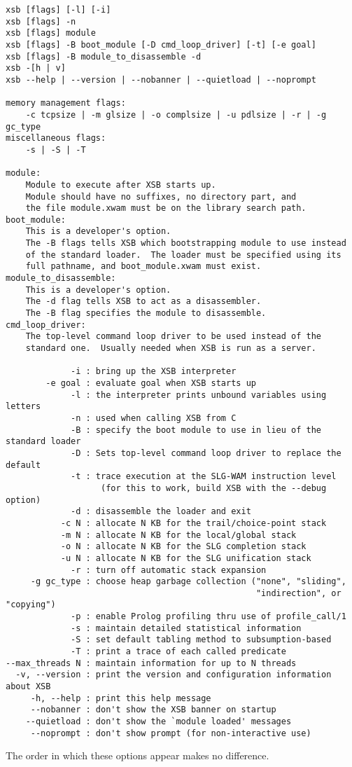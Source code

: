 {\small 
\begin{verbatim}
xsb [flags] [-l] [-i]
xsb [flags] -n
xsb [flags] module
xsb [flags] -B boot_module [-D cmd_loop_driver] [-t] [-e goal]
xsb [flags] -B module_to_disassemble -d
xsb -[h | v]
xsb --help | --version | --nobanner | --quietload | --noprompt

memory management flags:
    -c tcpsize | -m glsize | -o complsize | -u pdlsize | -r | -g gc_type
miscellaneous flags:
    -s | -S | -T

module:
    Module to execute after XSB starts up.
    Module should have no suffixes, no directory part, and
    the file module.xwam must be on the library search path.
boot_module:
    This is a developer's option.
    The -B flags tells XSB which bootstrapping module to use instead
    of the standard loader.  The loader must be specified using its
    full pathname, and boot_module.xwam must exist.
module_to_disassemble:
    This is a developer's option.
    The -d flag tells XSB to act as a disassembler.
    The -B flag specifies the module to disassemble.
cmd_loop_driver:
    The top-level command loop driver to be used instead of the
    standard one.  Usually needed when XSB is run as a server.
 
             -i : bring up the XSB interpreter
        -e goal : evaluate goal when XSB starts up
             -l : the interpreter prints unbound variables using letters
             -n : used when calling XSB from C
             -B : specify the boot module to use in lieu of the standard loader
             -D : Sets top-level command loop driver to replace the default
             -t : trace execution at the SLG-WAM instruction level
                   (for this to work, build XSB with the --debug option)
             -d : disassemble the loader and exit
           -c N : allocate N KB for the trail/choice-point stack
           -m N : allocate N KB for the local/global stack
           -o N : allocate N KB for the SLG completion stack
           -u N : allocate N KB for the SLG unification stack
             -r : turn off automatic stack expansion
     -g gc_type : choose heap garbage collection ("none", "sliding", 
                                                  "indirection", or "copying") 
             -p : enable Prolog profiling thru use of profile_call/1
             -s : maintain detailed statistical information
             -S : set default tabling method to subsumption-based
             -T : print a trace of each called predicate
--max_threads N : maintain information for up to N threads
  -v, --version : print the version and configuration information about XSB
     -h, --help : print this help message
     --nobanner : don't show the XSB banner on startup
    --quietload : don't show the `module loaded' messages
     --noprompt : don't show prompt (for non-interactive use)

\end{verbatim}
}
The order in which these options appear makes no difference.

